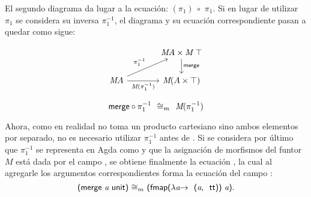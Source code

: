 El segundo diagrama da lugar a la ecuación: $(\pi_1) \ \circ$   $\pi_1$. Si en lugar de utilizar $\pi_1$ se considera su inversa $\pi_1^{-1}$, el diagrama y su ecuación correspondiente pasan a quedar como sigue:
\vspace{-1.25\baselineskip}

\begin{multicols}{2}
\begin{equation}\label{diagrama3}
\begin{tikzcd}[column sep = large]
& \AgdaBound{M} A \times \AgdaBound{M} \ \AgdaDatatype{$\top$} \arrow[d, "\AgdaField{merge}"]  \\
\AgdaBound{M} A \arrow[ur, "\pi_1^{-1}"] \arrow{r}[below]{\AgdaBound{M}(\pi_1^{-1})} & \AgdaBound{M} (A \times \AgdaDatatype{$\top$}) 
\end{tikzcd}
\end{equation}

\vspace*{\fill}
\begin{equation}
\AgdaField{merge} \circ \pi_1^{-1} \ \ \AgdaField{$\cong_m$} \ \ \AgdaBound{M} (\pi_1^{-1}) 
\end{equation}
\vspace*{\fill}
\end{multicols}

Ahora, como en realidad  no toma un producto cartesiano sino ambos elementos por separado, no es necesario utilizar $\pi_1^{-1}$ antes de . Si se considera por último que $\pi_1^{-1}$ se representa en Agda como \AgdaSymbol{($\lambda$}  \AgdaSymbol{$\rightarrow$ \ (} \AgdaSymbol{))} y que la asignación de morfismos del funtor $\mathit{M}$ está dada por el campo , se obtiene finalmente la ecuación    \AgdaSymbol{($\lambda$}  \AgdaSymbol{$\rightarrow$ \ (} \AgdaSymbol{))}, la cual al agregarle los argumentos correspondientes forma la ecuación del campo :  
\begin{equation*}
\AgdaSymbol{(}\AgdaField{merge} \ \AgdaBound{a} \ \AgdaField{unit}\AgdaSymbol{)} \   \AgdaField{$\cong_m$} \ \AgdaSymbol{(}\AgdaField{fmap} \AgdaSymbol{($\lambda$} \AgdaBound{a} \AgdaSymbol{$\rightarrow$ \ (}\AgdaBound{a} \AgdaInductiveConstructor{, \ tt} \AgdaSymbol{))} \ \AgdaBound{a}\AgdaSymbol{)}.
\end{equation*}


